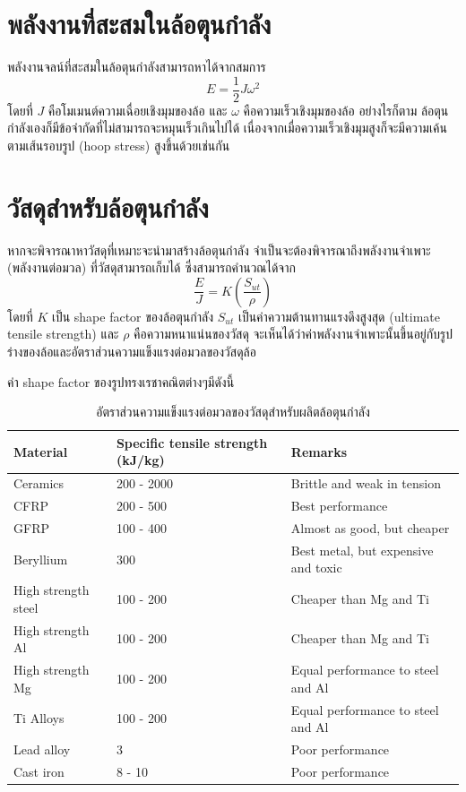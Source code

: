 \documentclass[a4paper,nobib,openany]{tufte-book}
\begin{document}
\section{พลังงานที่สะสมในล้อตุนกำลัง}
\label{sec:orgdd13f22}
พลังงานจลน์ที่สะสมในล้อตุนกำลังสามารถหาได้จากสมการ
\[E = \frac{1}{2}J \omega^2\] โดยที่ \(J\)
คือโมเมนต์ความเฉื่อยเชิงมุมของล้อ และ \(\omega\)
คือความเร็วเชิงมุมของล้อ อย่างไรก็ตาม
ล้อตุนกำลังเองก็มีข้อจำกัดที่ไม่สามารถจะหมุนเร็วเกินไปได้
เนื่องจากเมื่อความเร็วเชิงมุมสูงก็จะมีความเค้นตามเส้นรอบรูป (hoop
stress) สูงขึ้นด้วยเช่นกัน

\section{วัสดุสำหรับล้อตุนกำลัง}
\label{sec:org2b8c335}
หากจะพิจารณาหาวัสดุที่เหมาะจะนำมาสร้างล้อตุนกำลัง
จำเป็นจะต้องพิจารณาถึงพลังงานจำเพาะ (พลังงานต่อมวล)
ที่วัสดุสามารถเก็บได้ ซึ่งสามารถคำนวณได้จาก
\[\frac{E}{J} = K \left( \frac{S_{ut}}{\rho} \right)\] โดยที่ \(K\) เป็น
shape factor ของล้อตุนกำลัง \(S_{ut}\) เป็นค่าความต้านทานแรงดึงสูงสุด
(ultimate tensile strength) และ \(\rho\) คือความหนาแน่นของวัสดุ
จะเห็นได้ว่าค่าพลังงานจำเพาะนั้นขึ้นอยู่กับรูปร่างของล้อและอัตราส่วนความแข็งแรงต่อมวลของวัสดุล้อ

ค่า shape factor ของรูปทรงเรชาคณิตต่างๆมีดังนี้

\begin{table}[htbp]
\caption{อัตราส่วนความแข็งแรงต่อมวลของวัสดุสำหรับผลิตล้อตุนกำลัง}
\centering
\begin{tabular}{p{2.5cm}p{3cm}p{3.5cm}}
\toprule
Material & Specific tensile strength (kJ/kg) & Remarks\\
\midrule
Ceramics & 200 - 2000 & Brittle and weak in tension\\
CFRP & 200 - 500 & Best performance\\
GFRP & 100 - 400 & Almost as good, but cheaper\\
Beryllium & 300 & Best metal, but expensive and toxic\\
High strength steel & 100 - 200 & Cheaper than Mg and Ti\\
High strength Al & 100 - 200 & Cheaper than Mg and Ti\\
High strength Mg & 100 - 200 & Equal performance to steel and Al\\
Ti Alloys & 100 - 200 & Equal performance to steel and Al\\
Lead alloy & 3 & Poor performance\\
Cast iron & 8 - 10 & Poor performance\\
\bottomrule
\end{tabular}
\end{table}
\end{document}
